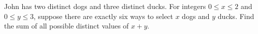 John has two distinct dogs and three distinct ducks. For integers $0\le x\le2$ and $0\le y\le3$, suppose there are exactly six ways to select $x$ dogs and $y$ ducks. Find the sum of all possible distinct values of $x+y$.
